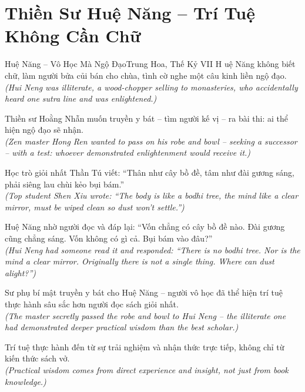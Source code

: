 \section{Thiền Sư Huệ Năng -- Trí Tuệ Không Cần Chữ}
\begin{truyen}{Huệ Năng -- Vô Học Mà Ngộ Đạo}{Trung Hoa, Thế Kỷ VII}
H uệ Năng không biết chữ, làm người bửa củi bán cho chùa, tình cờ nghe một câu kinh liền ngộ đạo.\\
\textit{(Hui Neng was illiterate, a wood-chopper selling to monasteries, who accidentally heard one sutra line and was enlightened.)}

Thiền sư Hoằng Nhẫn muốn truyền y bát -- tìm người kế vị -- ra bài thi: ai thể hiện ngộ đạo sẽ nhận.\\
\textit{(Zen master Hong Ren wanted to pass on his robe and bowl -- seeking a successor -- with a test: whoever demonstrated enlightenment would receive it.)}

Học trò giỏi nhất Thần Tú viết: ``Thân như cây bồ đề, tâm như đài gương sáng, phải siêng lau chùi kẻo bụi bám.''\\
\textit{(Top student Shen Xiu wrote: ``The body is like a bodhi tree, the mind like a clear mirror, must be wiped clean so dust won't settle.'')}

Huệ Năng nhờ người đọc và đáp lại: ``Vốn chẳng có cây bồ đề nào. Đài gương cũng chẳng sáng. Vốn không có gì cả. Bụi bám vào đâu?''\\
\textit{(Hui Neng had someone read it and responded: ``There is no bodhi tree. Nor is the mind a clear mirror. Originally there is not a single thing. Where can dust alight?'')}

Sư phụ bí mật truyền y bát cho Huệ Năng -- người vô học đã thể hiện trí tuệ thực hành sâu sắc hơn người đọc sách giỏi nhất.\\
\textit{(The master secretly passed the robe and bowl to Hui Neng -- the illiterate one had demonstrated deeper practical wisdom than the best scholar.)}

\end{truyen}
\begin{baihoc}
  Trí tuệ thực hành đến từ sự trải nghiệm và nhận thức trực tiếp, không chỉ từ kiến thức sách vở.\\
  \textit{(Practical wisdom comes from direct experience and insight, not just from book knowledge.)}
\end{baihoc}

